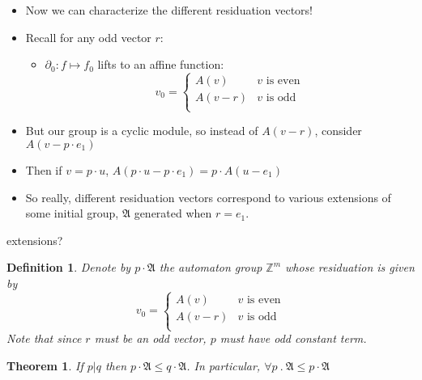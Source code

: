\documentclass{beamer}
\newtheorem{thm}{Theorem}
\newtheorem{defn}{Definition}
\newcommand{\2}{\textbf{2}}
\newcommand{\Z}{\mathbb{Z}}
\newcommand{\p}{\mathfrak{A}}
\begin{document}
\begin{frame}
  \begin{itemize}
    \item Now we can characterize the different residuation vectors!
    \item Recall for any odd vector $r$:
      \begin{itemize}
        \item $\partial_0:f \mapsto f_0$ lifts to an affine function:
          \[
            v_0 = 
            \begin{cases}
              A(v)   & v \text{ is even}\\
              A(v-r) & v \text{ is odd}\\
            \end{cases}
          \]
      \end{itemize}
    \item But our group is a cyclic module, so instead of $A(v-r)$, 
          consider $A(v - p \cdot e_1)$
    \item Then if $v = p \cdot u$, 
          $A(p \cdot u - p \cdot e_1) = p \cdot A(u - e_1)$
    \item So really, different residuation vectors correspond to 
          various extensions of some initial group, $\p$
          generated when $r = e_1$.
  \end{itemize}
\end{frame}

\begin{frame}{extensions?}
  \begin{defn}
    Denote by $p \cdot \p$ the automaton group $\Z^m$ whose 
    residuation is given by
      \[
        v_0 = 
        \begin{cases}
          A(v)   & v \text{ is even}\\
          A(v-r) & v \text{ is odd}\\
        \end{cases}
      \]
    Note that since $r$ must be an odd vector, 
    $p$ must have odd constant term.
  \end{defn}

  \begin{thm}
    If $p | q$ then $p \cdot \p \leq q \cdot \p$. 
    In particular, $\forall p~.~\p \leq p \cdot \p$
  \end{thm}
\end{frame}
\end{document}

